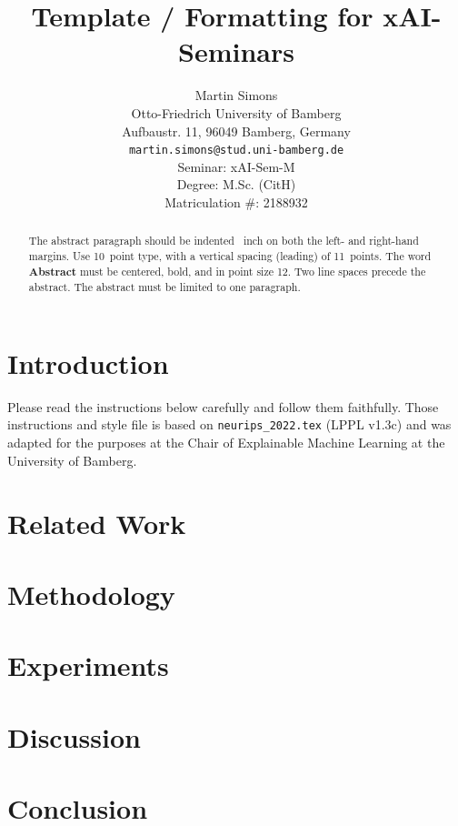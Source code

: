 \documentclass[a4paper]{article}
\title{Template / Formatting for xAI-Seminars}
\author{%
  Martin Simons\\
  Otto-Friedrich University of Bamberg\\
  Aufbaustr. 11, 96049 Bamberg, Germany\\
  \texttt{martin.simons@stud.uni-bamberg.de} \\[0.5cm]
  Seminar: xAI-Sem-M \\
  Degree: M.Sc. (CitH) \\
  Matriculation \#: 2188932
}
\begin{document}
\maketitle
\def\va{{\bm{a}}}

\begin{abstract}
  The abstract paragraph should be indented ~inch on
  both the left- and right-hand margins. Use 10~point type, with a vertical
  spacing (leading) of 11~points.  The word \textbf{Abstract} must be centered,
  bold, and in point size 12. Two line spaces precede the abstract. The abstract
  must be limited to one paragraph.
\end{abstract}


\section{Introduction}
\label{intro}

Please read the instructions below carefully and follow them faithfully. Those instructions and style file is based on \verb+neurips_2022.tex+ (LPPL v1.3c) and was adapted for the purposes at the Chair of Explainable Machine Learning at the University of Bamberg.

\section{Related Work}
\label{related}

\section{Methodology}
\label{meth}


\section{Experiments}
\label{exp}


\section{Discussion}
\label{disc}

\section{Conclusion}
\label{conc}






\end{document}
